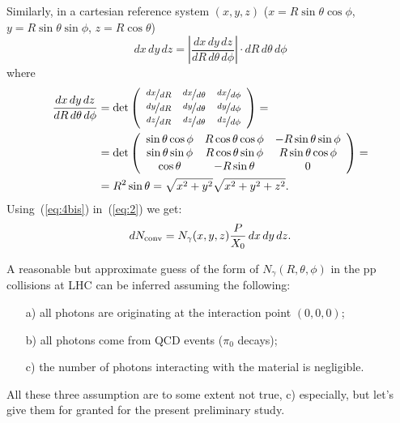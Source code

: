 Similarly, in a cartesian reference system $(x, y, z)$ ($x=R\sin\theta\cos\phi$, $y=R\sin\theta\sin\phi$, $z=R\cos\theta$)
\begin{equation}
 dx\,dy\,dz  = \left| \frac{dx\, dy\, dz}{dR\,d\theta\,d\phi}
   \right| \cdot dR\,d\theta\,d\phi
\label{eq:3tris}
\end{equation}
where
\begin{equation}
\begin{split}
\frac{dx\,dy\,dz}{dR\,d\theta\,d\phi}
& = \det \left( \begin{array}{ccc}
\nicefrac{dx}{dR}      & \nicefrac{dx}{d\theta}      & \nicefrac{dx}{d\phi} \\
\nicefrac{dy}{dR}      & \nicefrac{dy}{d\theta}      & \nicefrac{dy}{d\phi} \\
\nicefrac{dz}{dR}      & \nicefrac{dz}{d\theta}   & \nicefrac{dz}{d\phi}
\end{array} \right)
= \\
& = \det \left( \begin{array}{ccc}
\sin\theta\cos\phi & R\cos\theta\cos\phi & -R\sin\theta\sin\phi\\
\sin\theta\sin\phi & R\cos\theta\sin\phi &  R\sin\theta\cos\phi\\
\cos\theta & -R\sin\theta & 0 
\end{array} \right)
= \\
& = R^2 \sin \theta = \sqrt{x^2+y^2}\sqrt{x^2+y^2+z^2}.
\end{split}
\label{eq:4tris}
\end{equation}
Using~(\ref{eq:4bis}) in~(\ref{eq:2}) we get:
\begin{equation}
dN_{\rm conv} = N_{\gamma}(x, y, z) 
\frac{P}{X_0}
 \,dx\,dy\,dz .
\label{eq:5tris}
\end{equation}

A reasonable but approximate guess of the form of
$N_{\gamma}(R, \theta, \phi)$ in the pp collisions at LHC can be
inferred assuming the following:
\begin{itemize}
\item[a)] all photons are originating at the interaction point $(0, 0, 0)$;
\item[b)] all photons come from QCD events ($\pi_0$ decays);
\item[c)] the number of photons interacting with the material is negligible. 
\end{itemize}
All these three assumption are to some extent not true, c) especially,
but let's give them for granted for the present preliminary study.


